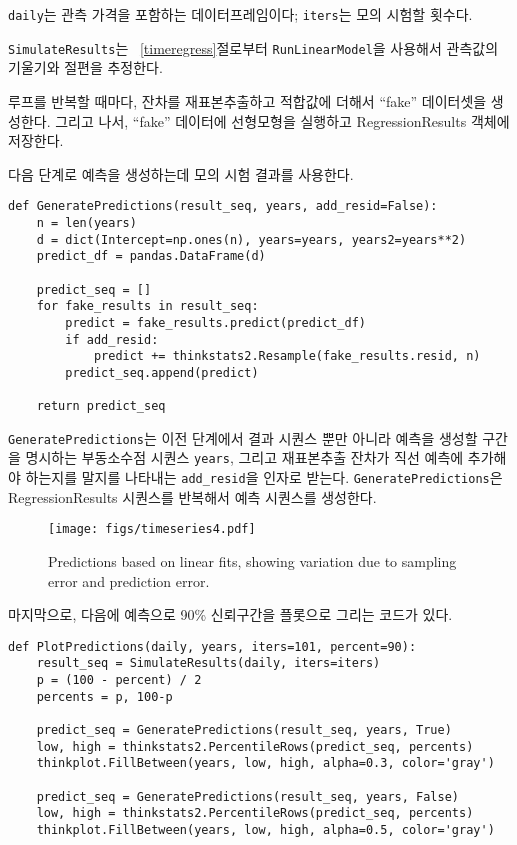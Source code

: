 {\tt daily}는 관측 가격을 포함하는 데이터프레임이다;
{\tt iters}는 모의 시험할 횟수다.

{\tt SimulateResults}는 ~\ref{timeregress}절로부터 {\tt RunLinearModel}을 사용해서 관측값의 기울기와 절편을 추정한다.

루프를 반복할 때마다, 잔차를 재표본추출하고 적합값에 더해서 ``fake'' 데이터셋을 생성한다. 그리고 나서, ``fake'' 데이터에 선형모형을 실행하고 RegressionResults 객체에 저장한다.

다음 단계로 예측을 생성하는데 모의 시험 결과를 사용한다.

\begin{verbatim}
def GeneratePredictions(result_seq, years, add_resid=False):
    n = len(years)
    d = dict(Intercept=np.ones(n), years=years, years2=years**2)
    predict_df = pandas.DataFrame(d)
    
    predict_seq = []
    for fake_results in result_seq:
        predict = fake_results.predict(predict_df)
        if add_resid:
            predict += thinkstats2.Resample(fake_results.resid, n)
        predict_seq.append(predict)

    return predict_seq
\end{verbatim}

{\tt GeneratePredictions}는 이전 단계에서 결과 시퀀스 뿐만 아니라 
예측을 생성할 구간을 명시하는 부동소수점 시퀀스 {\tt years}, 그리고 재표본추출 잔차가 직선 예측에 추가해야 하는지를 말지를 나타내는 \verb"add_resid"을 인자로 받는다.
{\tt GeneratePredictions}은 RegressionResults 시퀀스를 반복해서 예측 시퀀스를 생성한다.

\begin{figure}
\centerline{\texttt{[image: figs/timeseries4.pdf]}}
\caption{Predictions based on linear fits, showing variation due
to sampling error and prediction error.}
\label{timeseries4}
\end{figure}

마지막으로, 다음에 예측으로 90\% 신뢰구간을 플롯으로 그리는 코드가 있다.

\begin{verbatim}
def PlotPredictions(daily, years, iters=101, percent=90):
    result_seq = SimulateResults(daily, iters=iters)
    p = (100 - percent) / 2
    percents = p, 100-p

    predict_seq = GeneratePredictions(result_seq, years, True)
    low, high = thinkstats2.PercentileRows(predict_seq, percents)
    thinkplot.FillBetween(years, low, high, alpha=0.3, color='gray')

    predict_seq = GeneratePredictions(result_seq, years, False)
    low, high = thinkstats2.PercentileRows(predict_seq, percents)
    thinkplot.FillBetween(years, low, high, alpha=0.5, color='gray')
\end{verbatim}

